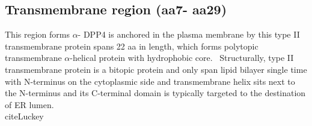 \subsection{Transmembrane region (aa7- aa29)}

This region forms $\alpha$-
DPP4 is anchored in the plasma membrane by this type II transmembrane protein spans 22 aa in length, which forms polytopic transmembrane $\alpha$-helical protein with hydrophobic core.~\cite{Hong_1990} Structurally, type II transmembrane protein is a bitopic protein and only span lipid bilayer single time with N-terminus on the cytoplasmic side and transmembrane helix sits next to the N-terminus and its C-terminal domain is typically targeted to the destination of ER lumen.~\\cite{Luckey}  


